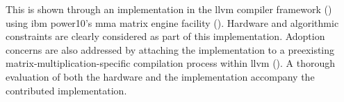 \documentclass[\main/thesis.tex]{subfiles}
\begin{document}
This is shown through an implementation in the \gls{llvm} compiler framework () using \acrshort{ibm} \gls{power10}'s \acrshort{mma} matrix engine facility ().
Hardware and algorithmic constraints are clearly considered as part of this implementation.
Adoption concerns are also addressed by attaching the implementation to a preexisting matrix-multiplication-specific compilation process within \gls{llvm} ().
A thorough evaluation of both the hardware and the implementation accompany the contributed implementation.

\end{document}
